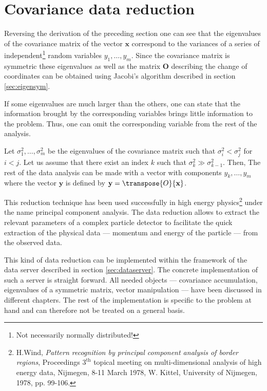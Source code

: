 {\section{Covariance data reduction}
\label{sec:datared} Reversing the derivation of the preceding
section one can see that the eigenvalues of the covariance matrix
of the vector $\textbf{x}$ correspond to the variances of a series of
independent\footnote{Not necessarily normally distributed!} random
variables $y_1,\dots,y_m$. Since the covariance matrix is
symmetric these eigenvalues as well as the matrix $\textbf{O}$
describing the change of coordinates can be obtained using
Jacobi's algorithm described in section \ref{sec:eigensym}.

If some eigenvalues are much larger than the others, one can state
that the information brought by the corresponding variables brings
little information to the problem. Thus, one can omit the
corresponding variable from the rest of the analysis.

Let $\sigma^2_1,\ldots,\sigma^2_m$ be the eigenvalues of the
covariance matrix such that $\sigma^2_i < \sigma^2_j$ for $i<j$.
Let us assume that there exist an index $k$ such that $\sigma^2_k
\gg \sigma^2_{k-1}$. Then,  The rest of the data analysis can be
made with a vector with components $y_k,\ldots,y_m$ where the
vector $\textbf{y}$ is defined by $\textbf{y}=\transpose{O}{\textbf x}$.

This reduction technique has been used successfully in high energy
physics\footnote{H.Wind, {\em Pattern recognition by principal
component analysis of border regions}, Proceedings $3^{\mathop\textrm{
th}}$ topical meeting on multi-dimensional analysis of high energy
data, Nijmegen, 8-11 March 1978, W. Kittel, University of
Nijmegen, 1978, pp. 99-106.} under the name principal component
analysis. The data reduction allows to extract the relevant
parameters of a complex particle detector to facilitate the quick
extraction of the physical data --- momentum and energy of the
particle --- from the observed data.

This kind of data reduction can be implemented within the
framework of the data server described in section
\ref{sec:dataserver}. The concrete implementation of such a server
is straight forward. All needed objects --- covariance
accumulation, eigenvalues of a symmetric matrix, vector
manipulation --- have been discussed in different chapters. The
rest of the implementation is specific to the problem at hand and
can therefore not be treated on a general basis.

}
